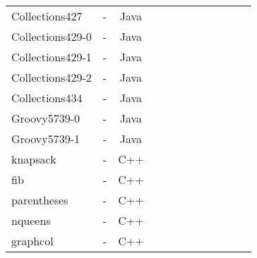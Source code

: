 \begin{table*}
\begin{tabular}{lcccc|cccc|ccc}
Collections427    &   - & Java  &  &              &    &                                 &                   &                           &                        &   &        \\
Collections429-0    &  -  & Java  &  &              &    &                                 &                   &                           &                        &   &        \\
Collections429-1    &  -  & Java  &  &              &    &                                 &                   &                           &                        &   &        \\
Collections429-2    &  -  & Java  &  &              &    &                                 &                   &                           &                        &   &        \\
Collections434    & -   & Java  &  &              &    &                                 &                   &                           &                        &   &        \\
\midrule
Groovy5739-0      & -  & Java  &  &              &    &                                 &                   &                           &                        &   &        \\
Groovy5739-1      & -  & Java  &  &              &    &                                 &                   &                           &                        &   &        \\
\midrule
\midrule
knapsack      &  -  & C++  &  &              &    &                                 &                   &                           &                        &   &        \\
fib      &  - & C++  &  &              &    &                                 &                   &                           &                        &   &        \\
parentheses      & -   & C++  &  &              &    &                                 &                   &                           &                        &   &        \\
nqueens      &  -  & C++  &  &              &    &                                 &                   &                           &                        &   &        \\
graphcol      &  -  & C++  &  &              &    &                                 &                   &                           &                        &   &        \\

\end{tabular}
\end{table*}
